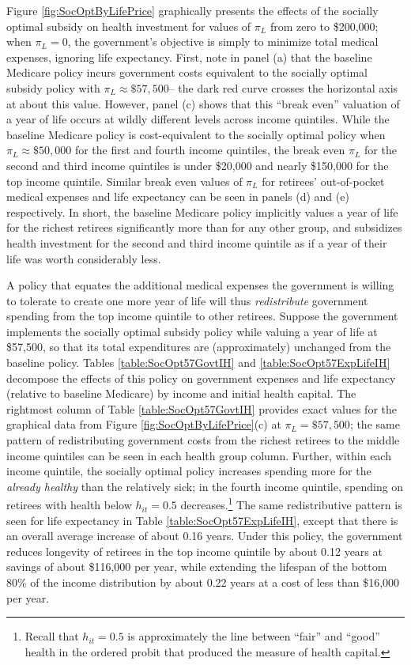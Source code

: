 \documentclass[12pt,pdftex,letterpaper]{article}
\newcommand{\Health}{h}
\begin{document}
Figure \ref{fig:SocOptByLifePrice} graphically presents the effects of the socially optimal subsidy on health investment for values of $\pi_L$ from zero to \$200,000; when $\pi_L=0$, the government's objective is simply to minimize total medical expenses, ignoring life expectancy.  First, note in panel (a) that the baseline Medicare policy incurs government costs equivalent to the socially optimal subsidy policy with $\pi_L \approx \$57,500$-- the dark red curve crosses the horizontal axis at about this value.  However, panel (c) shows that this ``break even'' valuation of a year of life occurs at wildly different levels across income quintiles.  While the baseline Medicare policy is cost-equivalent to the socially optimal policy when $\pi_L \approx \$50,000$ for the first and fourth income quintiles, the break even $\pi_L$ for the second and third income quintiles is under \$20,000 and nearly \$150,000 for the top income quintile.  Similar break even values of $\pi_L$ for retirees' out-of-pocket medical expenses and life expectancy can be seen in panels (d) and (e) respectively.  In short, the baseline Medicare policy implicitly values a year of life for the richest retirees significantly more than for any other group, and subsidizes health investment for the second and third income quintile as if a year of their life was worth considerably less.

A policy that equates the additional medical expenses the government is willing to tolerate to create one more year of life will thus \textit{redistribute} government spending from the top income quintile to other retirees.  Suppose the government implements the socially optimal subsidy policy while valuing a year of life at \$57,500, so that its total expenditures are (approximately) unchanged from the baseline policy.  Tables \ref{table:SocOpt57GovtIH} and \ref{table:SocOpt57ExpLifeIH} decompose the effects of this policy on government expenses and life expectancy (relative to baseline Medicare) by income and initial health capital.  The rightmost column of Table \ref{table:SocOpt57GovtIH} provides exact values for the graphical data from Figure \ref{fig:SocOptByLifePrice}(c) at $\pi_L = \$57,500$; the same pattern of redistributing government costs from the richest retirees to the middle income quintiles can be seen in each health group column.  Further, within each income quintile, the socially optimal policy increases spending more for the \textit{already healthy} than the relatively sick; in the fourth income quintile, spending on retirees with health below $\Health_{it} = 0.5$ decreases.\footnote{Recall that $\Health_{it} = 0.5$ is approximately the line between ``fair'' and ``good'' health in the ordered probit that produced the measure of health capital.}  The same redistributive pattern is seen for life expectancy in Table \ref{table:SocOpt57ExpLifeIH}, except that there is an overall average increase of about 0.16 years.  Under this policy, the government reduces longevity of retirees in the top income quintile by about 0.12 years at savings of about \$116,000 per year, while extending the lifespan of the bottom 80\% of the income distribution by about 0.22 years at a cost of less than \$16,000 per year.
\end{document}
